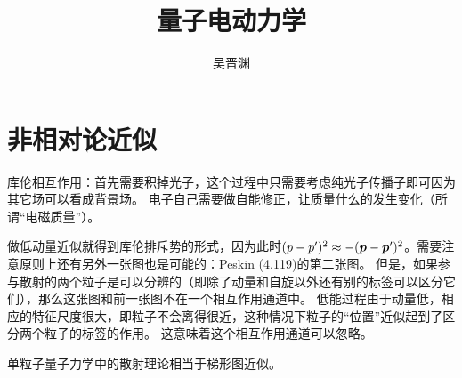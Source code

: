 \documentclass[hyperref, UTF8, a4paper]{ctexart}
\title{量子电动力学}
\author{吴晋渊}
\begin{document}
\maketitle

\section{非相对论近似}

库伦相互作用：首先需要积掉光子，这个过程中只需要考虑纯光子传播子即可因为其它场可以看成背景场。
电子自己需要做自能修正，让质量什么的发生变化（所谓“电磁质量”）。

做低动量近似就得到库伦排斥势的形式，因为此时$(p - p')^2 \approx - (\vb*{p} - \vb*{p}')^2$。需要注意原则上还有另外一张图也是可能的：Peskin (4.119)的第二张图。
但是，如果参与散射的两个粒子是可以分辨的（即除了动量和自旋以外还有别的标签可以区分它们），那么这张图和前一张图不在一个相互作用通道中。
低能过程由于动量低，相应的特征尺度很大，即粒子不会离得很近，这种情况下粒子的“位置”近似起到了区分两个粒子的标签的作用。
这意味着这个相互作用通道可以忽略。

单粒子量子力学中的散射理论相当于梯形图近似。
\end{document}
